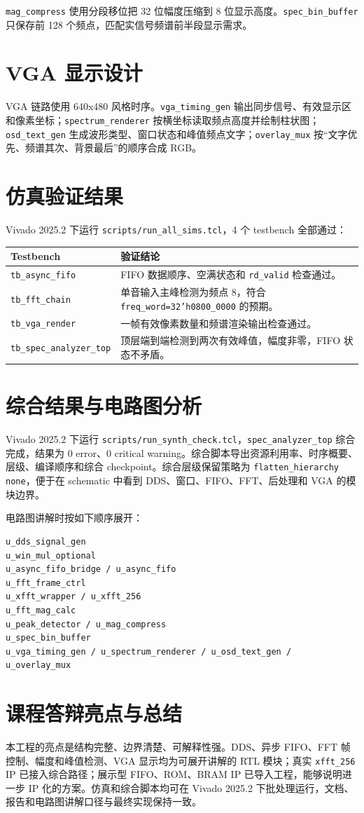 \documentclass[UTF8,a4paper,12pt]{ctexart}
\begin{document}
\texttt{mag\_compress} 使用分段移位把 32 位幅度压缩到 8 位显示高度。\texttt{spec\_bin\_buffer} 只保存前 128 个频点，匹配实信号频谱前半段显示需求。

\section{VGA 显示设计}

VGA 链路使用 640x480 风格时序。\texttt{vga\_timing\_gen} 输出同步信号、有效显示区和像素坐标；\texttt{spectrum\_renderer} 按横坐标读取频点高度并绘制柱状图；\texttt{osd\_text\_gen} 生成波形类型、窗口状态和峰值频点文字；\texttt{overlay\_mux} 按“文字优先、频谱其次、背景最后”的顺序合成 RGB。

\section{仿真验证结果}

Vivado 2025.2 下运行 \texttt{scripts/run\_all\_sims.tcl}，4 个 testbench 全部通过：

\begin{longtable}{p{}p{}}
\toprule
Testbench & 验证结论 \\
\midrule
\endhead
\texttt{tb\_async\_fifo} & FIFO 数据顺序、空满状态和 \texttt{rd\_valid} 检查通过。 \\
\texttt{tb\_fft\_chain} & 单音输入主峰检测为频点 8，符合 \texttt{freq\_word=32'h0800\_0000} 的预期。 \\
\texttt{tb\_vga\_render} & 一帧有效像素数量和频谱渲染输出检查通过。 \\
\texttt{tb\_spec\_analyzer\_top} & 顶层端到端检测到两次有效峰值，幅度非零，FIFO 状态不矛盾。 \\
\bottomrule
\end{longtable}

\section{综合结果与电路图分析}

Vivado 2025.2 下运行 \texttt{scripts/run\_synth\_check.tcl}，\texttt{spec\_analyzer\_top} 综合完成，结果为 0 error、0 critical warning。综合脚本导出资源利用率、时序概要、层级、编译顺序和综合 checkpoint。综合层级保留策略为 \texttt{flatten\_hierarchy none}，便于在 schematic 中看到 DDS、窗口、FIFO、FFT、后处理和 VGA 的模块边界。

电路图讲解时按如下顺序展开：

\begin{verbatim}
u_dds_signal_gen
u_win_mul_optional
u_async_fifo_bridge / u_async_fifo
u_fft_frame_ctrl
u_xfft_wrapper / u_xfft_256
u_fft_mag_calc
u_peak_detector / u_mag_compress
u_spec_bin_buffer
u_vga_timing_gen / u_spectrum_renderer / u_osd_text_gen / u_overlay_mux
\end{verbatim}

\section{课程答辩亮点与总结}

本工程的亮点是结构完整、边界清楚、可解释性强。DDS、异步 FIFO、FFT 帧控制、幅度和峰值检测、VGA 显示均为可展开讲解的 RTL 模块；真实 \texttt{xfft\_256} IP 已接入综合路径；展示型 FIFO、ROM、BRAM IP 已导入工程，能够说明进一步 IP 化的方案。仿真和综合脚本均可在 Vivado 2025.2 下批处理运行，文档、报告和电路图讲解口径与最终实现保持一致。
\end{document}
